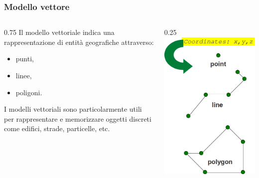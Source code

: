 \documentclass{beamer}
\begin{document}
{\begin{frame}
  \frametitle{Modello vettore}
  \begin{columns}
		\begin{column} {0.75\textwidth}	
			Il modello vettoriale indica una rappresentazione di entità geografiche attraverso: 
   	 \begin{itemize}
   		\item punti,
   		\item linee,
   		\item poligoni.
   	\end{itemize}
  		I modelli vettoriali sono particolarmente utili per rappresentare e memorizzare oggetti discreti come edifici, strade, particelle, etc.					
		\end{column}
		\begin{column} {0.25\textwidth}	
			\includegraphics[width=1\textwidth] {./digitizing_pics/geom2.png}	
		\end{column}
	\end{columns}
   

\end{frame}}
\end{document}
